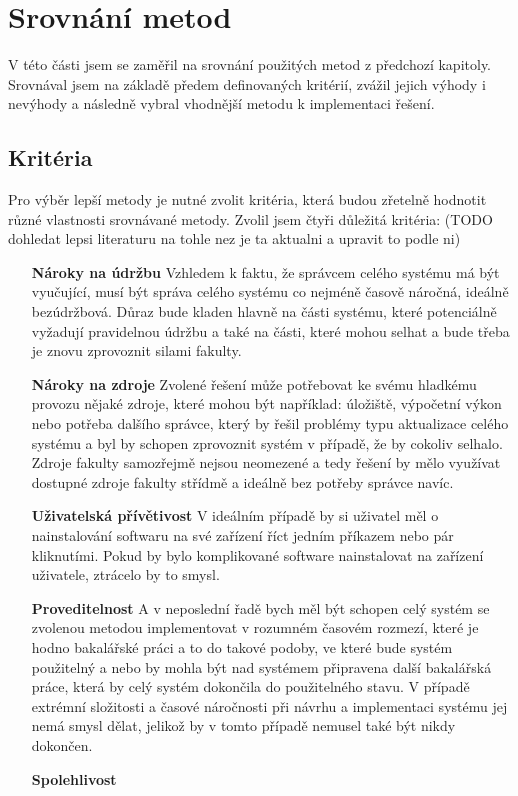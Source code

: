 \documentclass[
  digital,     %
  oneside,     %
  nosansbold,  %
  nocolorbold, %
  lof,         %
  lot,         %
]{fithesis4}
\begin{document}
\chapter{Srovnání metod}

V této části jsem se zaměřil na srovnání použitých metod z předchozí
kapitoly. Srovnával jsem na základě předem definovaných kritérií, zvážil
jejich výhody i nevýhody a následně vybral vhodnější metodu k implementaci
řešení.


\section{Kritéria}

Pro výběr lepší metody je nutné zvolit kritéria, která budou zřetelně hodnotit
různé vlastnosti srovnávané metody. Zvolil jsem čtyři důležitá kritéria:
(TODO dohledat lepsi literaturu na tohle nez je ta aktualni a upravit to podle ni)

\begin{itemize}
    \item[\textbf{Nároky na údržbu}] Vzhledem k faktu, že správcem celého
    systému má být vyučující, musí být správa celého systému co nejméně
    časově náročná, ideálně bezúdržbová. Důraz bude kladen hlavně na části
    systému, které potenciálně vyžadují pravidelnou údržbu a také na části,
    které mohou selhat a bude třeba je znovu zprovoznit silami fakulty.
    \item[\textbf{Nároky na zdroje}] Zvolené řešení může potřebovat ke
    svému hladkému provozu nějaké zdroje, které mohou být například:
    úložiště, výpočetní výkon nebo potřeba dalšího správce, který by
    řešil problémy typu aktualizace celého systému a byl by schopen
    zprovoznit systém v případě, že by cokoliv selhalo. Zdroje fakulty
    samozřejmě nejsou neomezené a tedy řešení by mělo využívat dostupné
    zdroje fakulty střídmě a ideálně bez potřeby správce navíc.
    \item[\textbf{Uživatelská přívětivost}] V ideálním případě by si
    uživatel měl o nainstalování softwaru na své zařízení říct jedním 
    příkazem nebo pár kliknutími. Pokud by bylo komplikované software
    nainstalovat na zařízení uživatele, ztrácelo by to smysl.
    \item[\textbf{Proveditelnost}] A v neposlední řadě bych měl být schopen
    celý systém se zvolenou metodou implementovat v rozumném časovém 
    rozmezí, které je hodno bakalářské práci a to do takové podoby, ve které
    bude systém použitelný a nebo by mohla být nad systémem připravena další
    bakalářská práce, která by celý systém dokončila do použitelného stavu.
    V případě extrémní složitosti a časové náročnosti při  návrhu a
    implementaci systému jej nemá smysl dělat, jelikož by v tomto případě
    nemusel také být nikdy dokončen.
    \item[\textbf{Spolehlivost}]
\end{itemize}
\end{document}
